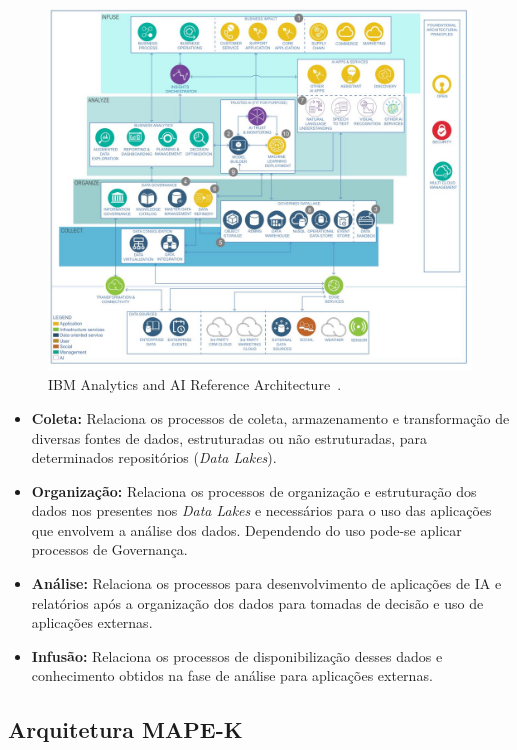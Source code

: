 \documentclass[portugues]{ic-tese}
\begin{document}
\begin{figure}[h]
\centering
\includegraphics[scale=0.25]{images/ai-analytics-ref-diagram-analyze.jpg}
\caption {IBM Analytics and AI Reference Architecture~\citep{IBM_2021}.}
\label{fig:AIReferenceArchitecture}
\end{figure}

\begin{itemize}
\item \textbf{Coleta:} Relaciona os processos de coleta, armazenamento e transformação de diversas fontes de dados, estruturadas ou não estruturadas, para determinados repositórios (\textit{Data Lakes}).
\item \textbf{Organização:} Relaciona os processos de organização e estruturação dos dados nos presentes nos \textit{Data Lakes} e necessários para o uso das aplicações que envolvem a análise dos dados. Dependendo do uso pode-se aplicar processos de Governança.
\item \textbf{Análise:} Relaciona os processos para desenvolvimento de aplicações de IA e relatórios após a organização dos dados para tomadas de decisão e uso de aplicações externas.
\item \textbf{Infusão:} Relaciona os processos de disponibilização desses dados e conhecimento obtidos na fase de análise para aplicações externas.
\end{itemize}

\subsection{Arquitetura MAPE-K}
\end{document}
